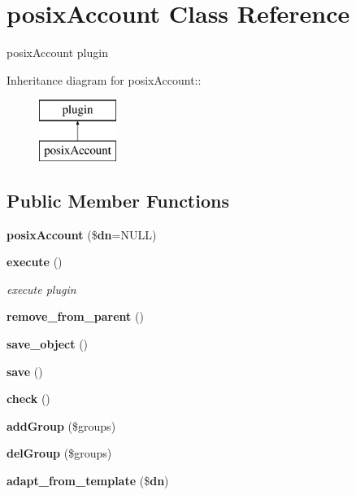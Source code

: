 \section{posix\-Account Class Reference}
\label{classposixAccount}
posix\-Account plugin  


Inheritance diagram for posix\-Account::\begin{figure}[H]
\begin{center}
\leavevmode
\includegraphics[height=2cm]{classposixAccount}
\end{center}
\end{figure}
\subsection*{Public Member Functions}
\begin{CompactItemize}
\item 
{\bf posix\-Account} (\${\bf dn}=NULL)\label{classposixAccount_a0}

\item 
{\bf execute} ()
\begin{CompactList}\small\item\em execute plugin \item\end{CompactList}\item 
{\bf remove\_\-from\_\-parent} ()\label{classposixAccount_a2}

\item 
{\bf save\_\-object} ()\label{classposixAccount_a3}

\item 
{\bf save} ()\label{classposixAccount_a4}

\item 
{\bf check} ()\label{classposixAccount_a5}

\item 
{\bf add\-Group} (\$groups)\label{classposixAccount_a6}

\item 
{\bf del\-Group} (\$groups)\label{classposixAccount_a7}

\item 
{\bf adapt\_\-from\_\-template} (\${\bf dn})\label{classposixAccount_a8}

\end{CompactItemize}
